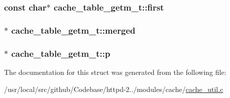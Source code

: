 \subsubsection[{\texorpdfstring{first}{first}}]{\setlength{\rightskip}{0pt plus 5cm}const char$\ast$ cache\+\_\+table\+\_\+getm\+\_\+t\+::first}\hypertarget{structcache__table__getm__t_a32828dd02e32454edba8b5b0c82cefed}{}\label{structcache__table__getm__t_a32828dd02e32454edba8b5b0c82cefed}
\subsubsection[{\texorpdfstring{merged}{merged}}]{$\ast$ cache\+\_\+table\+\_\+getm\+\_\+t\+::merged}\hypertarget{structcache__table__getm__t_a87987bba6b631eccdcb7dfa3dbf556b5}{}\label{structcache__table__getm__t_a87987bba6b631eccdcb7dfa3dbf556b5}
\subsubsection[{\texorpdfstring{p}{p}}]{$\ast$ cache\+\_\+table\+\_\+getm\+\_\+t\+::p}\hypertarget{structcache__table__getm__t_aef53ee2fbdd18ae818995ca2d0367c8f}{}\label{structcache__table__getm__t_aef53ee2fbdd18ae818995ca2d0367c8f}


The documentation for this struct was generated from the following file\+:\begin{DoxyCompactItemize}
\item 
/usr/local/src/github/\+Codebase/httpd-\/2../modules/cache/\hyperlink{cache__util_8c}{cache\+\_\+util.\+c}\end{DoxyCompactItemize}
